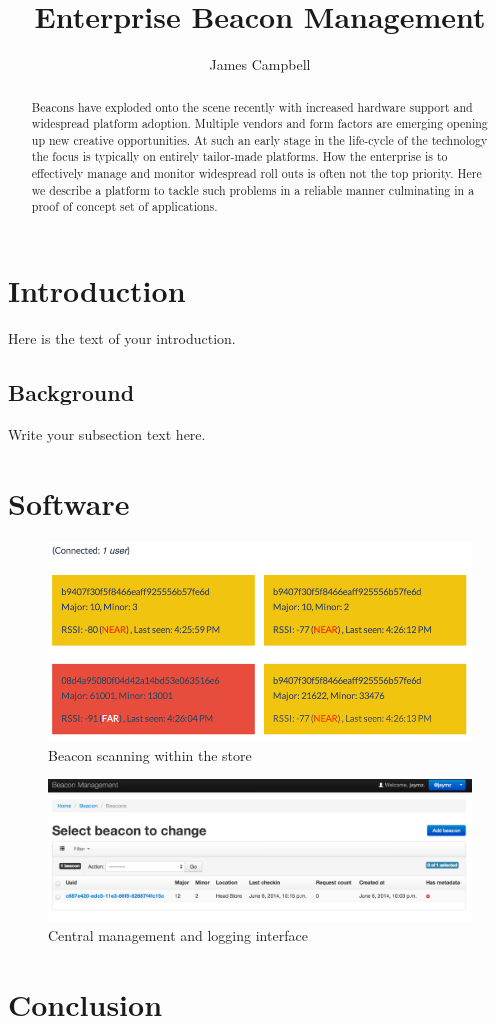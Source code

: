 \documentclass{article}
\begin{document}
\title{Enterprise Beacon Management}
\author{James Campbell}

\maketitle

\begin{abstract}
Beacons have exploded onto the scene recently with increased hardware support and widespread platform adoption. Multiple vendors and form factors are emerging opening up new creative opportunities. At such an early stage in the life-cycle of the technology the focus is typically on entirely tailor-made platforms. How the enterprise is to effectively manage and monitor widespread roll outs is often not the top priority. Here we describe a platform to tackle such problems in a reliable manner culminating in a proof of concept set of applications.
\end{abstract}

\section{Introduction}
Here is the text of your introduction.

\subsection{Background}
Write your subsection text here.

\section{Software}

\begin{figure}
    \centering
    \includegraphics[width=\textwidth]{images/scanning.png}
    \caption{Beacon scanning within the store}
    \label{scanning}
\end{figure}

\begin{figure}
    \centering
    \includegraphics[width=\textwidth]{images/management.png}
    \caption{Central management and logging interface}
    \label{django_admin}
\end{figure}

\section{Conclusion}
\end{document}
